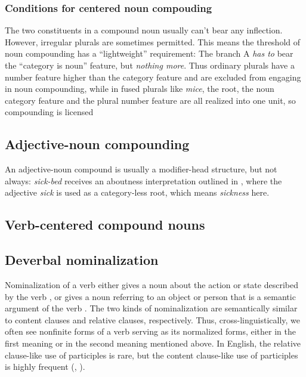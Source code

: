 \documentclass[UTF8, a4paper, oneside, scheme=plain, 12pt]{ctexbook}
\newcommand*{\citesec}[1]{\S~{#1}}
\newcommand*{\citepage}[1]{p.~{#1}}
\newcommand{\form}[1]{\emph{#1}}
\begin{document}
\subsubsection{Conditions for centered noun compouding}

The two constituents in a compound noun usually can't bear any inflection.
However, irregular plurals are sometimes permitted.
This means the threshold of noun compounding has a ``lightweight'' requirement:
The branch A \emph{has to} bear the ``category is noun'' feature,
but \emph{nothing more}.
Thus ordinary plurals have a number feature higher than the category feature 
and are excluded from engaging in noun compounding,
while in fused plurals like \form{mice},
the root, the noun category feature and the plural number feature 
are all realized into one unit,
so compounding is licensed \citep[\citesec{7.1}]{siddiqi2009syntax}

\subsection{Adjective-noun compounding}

An adjective-noun compound is usually a modifier-head structure, 
but not always: 
\form{sick-bed} receives an aboutness interpretation outlined in ,
where the adjective \form{sick} is used as a category-less root,
which means \form{sickness} here.

\subsection{Verb-centered compound nouns}\label{sec:pos.noun.compound.verb-centered}

\subsection{Deverbal nominalization}

Nominalization of a verb either gives a noun about the action or state described by the verb
\citep[\citepage{1700}]{cgel},
or gives a noun referring to an object or person 
that is a semantic argument of the verb \citep[\citepage{1697}]{cgel}.
The two kinds of nominalization are semantically similar to 
content clauses and relative clauses, respectively.
Thus, cross-linguistically, 
we often see nonfinite forms of a verb serving as 
its normalized forms,
either in the first meaning or in the second meaning mentioned above.
In English, the relative clause-like use of participles is rare, 
but the content clause-like use of participles is highly frequent
(, ).
\end{document}
